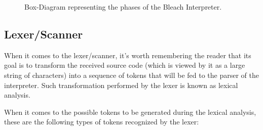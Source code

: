 \begin{figure}[h!]
  \centering
  \caption{Box-Diagram representing the phases of the Bleach Interpreter.}
\end{figure}

\subsection{Lexer/Scanner}
When it comes to the lexer/scanner, it's worth remembering the reader that its goal is to transform the received source code (which is viewed by it as a large string of characters) into a sequence of tokens that will be fed to the parser of the interpreter. Such transformation performed by the lexer is known as lexical analysis.

When it comes to the possible tokens to be generated during the lexical analysis, these are the following types of tokens recognized by the lexer:

